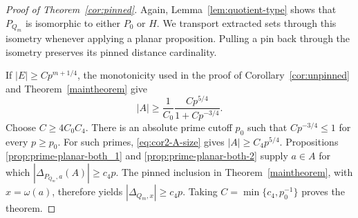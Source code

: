 \documentclass[11pt]{article}
\begin{document}

\begin{proof}[Proof of Theorem~\ref{cor:pinned}]
Again, Lemma~\ref{lem:quotient-type} shows that $P_{Q_m}$ is isomorphic to either $P_0$ or $H$.  We
transport extracted sets through this isometry whenever applying a
planar proposition.  Pulling a pin back through the isometry
preserves its pinned distance cardinality.

If $|E|\ge Cp^{m+1/4}$, the monotonicity used in the proof
of Corollary~\ref{cor:unpinned} and Theorem~\ref{maintheorem} give
\begin{equation}
 \label{eq:cor2-A-size}
 |A|\ge
 \frac1{C_0}
 \frac{Cp^{5/4}}
      {1+Cp^{-3/4}}.
\end{equation}
Choose
$C\ge4C_0C_4$.  There is an absolute
prime cutoff $p_0$ such that
$Cp^{-3/4}\le1$ for every $p\ge p_0$.  For such
primes, \eqref{eq:cor2-A-size} gives $|A|\ge C_4p^{5/4}$.
Propositions \ref{prop:prime-planar-both_1} and \ref{prop:prime-planar-both-2} supply $a\in A$ for
which $|\Delta_{P_{Q_m},a}(A)|\ge c_4p$. 
The pinned inclusion in Theorem~\ref{maintheorem}, with
$x=\omega(a)$, therefore yields $|\Delta_{Q_m, x}|\ge c_4p$. 
Taking $C=\min\{c_4,p_0^{-1}\}$ proves the theorem.
\end{proof}
\end{document}
